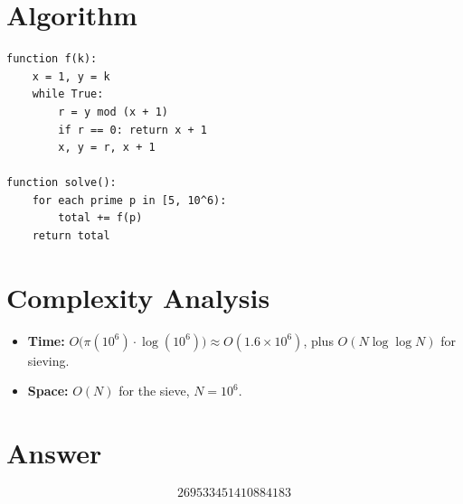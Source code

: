 \documentclass[a4paper,12pt]{article}
\begin{document}
\section{Algorithm}

\begin{verbatim}
function f(k):
    x = 1, y = k
    while True:
        r = y mod (x + 1)
        if r == 0: return x + 1
        x, y = r, x + 1

function solve():
    for each prime p in [5, 10^6):
        total += f(p)
    return total
\end{verbatim}

\section{Complexity Analysis}
\begin{itemize}
    \item \textbf{Time:} $O\bigl(\pi(10^6) \cdot \log(10^6)\bigr) \approx O(1.6 \times 10^6)$, plus $O(N \log\log N)$ for sieving.
    \item \textbf{Space:} $O(N)$ for the sieve, $N = 10^6$.
\end{itemize}

\section{Answer}

\[
\boxed{269533451410884183}
\]
\end{document}

